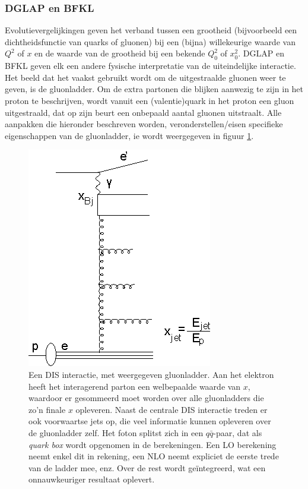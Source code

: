 \documentclass[a4paper,11pt]{article}
\numberwithin{equation}{section} %
\begin{document}
    \subsubsection{DGLAP en BFKL}
Evolutievergelijkingen geven het verband tussen een grootheid (bijvoorbeeld een dichtheidsfunctie van quarks of gluonen) bij een (bijna) willekeurige waarde van $Q^2$ of $x$ en de waarde van de grootheid bij een bekende $Q_0^2$ of $x_0^2$.
DGLAP en BFKL geven elk een andere fysische interpretatie van de uiteindelijke interactie.
Het beeld dat het vaakst gebruikt wordt om de uitgestraalde gluonen weer te geven, is de gluonladder.
Om de extra partonen die blijken aanwezig te zijn in het proton te beschrijven, wordt vanuit een (valentie)quark in het proton een gluon uitgestraald, dat op zijn beurt een onbepaald aantal gluonen uitstraalt.
Alle aanpakken die hieronder beschreven worden, veronderstellen/eisen specifieke eigenschappen van de gluonladder, ie wordt weergegeven in figuur \ref{fig:GluonLadder}.
\begin{figure} [H]
  \begin{center}
    \includegraphics[scale=1]{Afbeeldingen/GluonLadder.eps}
    \caption{Een DIS interactie, met weergegeven gluonladder. Aan het elektron heeft het interagerend parton een welbepaalde waarde van $x$, waardoor er gesommeerd moet worden over alle gluonladders die zo’n finale $x$ opleveren. Naast de centrale DIS interactie treden er ook voorwaartse jets op, die veel informatie kunnen opleveren over de gluonladder zelf. Het foton splitst zich in een $q\bar{q}$-paar, dat als \textit{quark box} wordt opgenomen in de berekeningen. Een LO berekening neemt enkel dit in rekening, een NLO neemt expliciet de eerste trede van de ladder mee, enz. Over de rest wordt geïntegreerd, wat een onnauwkeuriger resultaat oplevert.\cite{Kiesling}}
   \label{fig:GluonLadder}
  \end{center}
\end{figure}
\end{document}
